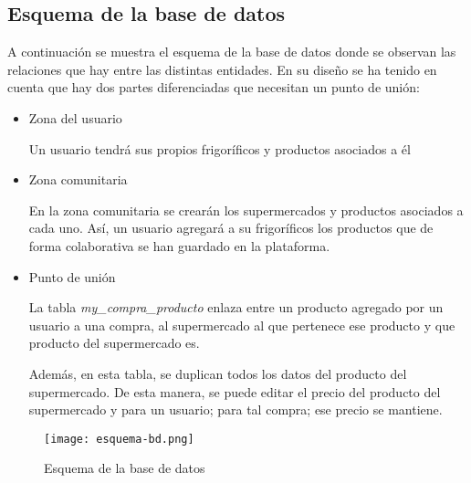\subsection{Esquema de la base de datos}

    A continuación se muestra el esquema de la base de datos donde se observan las relaciones que hay entre las distintas entidades. En su diseño se ha tenido en cuenta que hay dos partes diferenciadas que necesitan un punto de unión:

    \begin{itemize}
        \item Zona del usuario

            Un usuario tendrá sus propios frigoríficos y productos asociados a él

        \item Zona comunitaria

            En la zona comunitaria se crearán los supermercados y productos asociados a cada uno. Así, un usuario agregará a su frigoríficos los productos que de forma colaborativa se han guardado en la plataforma.

        \item Punto de unión

            La tabla \emph{my\_compra\_producto} enlaza entre un producto agregado por un usuario a una compra, al supermercado al que pertenece ese producto y que producto del supermercado es.

            Además, en esta tabla, se duplican todos los datos del producto del supermercado. De esta manera, se puede editar el precio del producto del supermercado y para un usuario; para tal compra; ese precio se mantiene.
    \end{itemize}

\begin{figure}[H]
    \centering
    \texttt{[image: esquema-bd.png]}
    \caption{Esquema de la base de datos}\label{fig:esquema-bd}
\end{figure}
